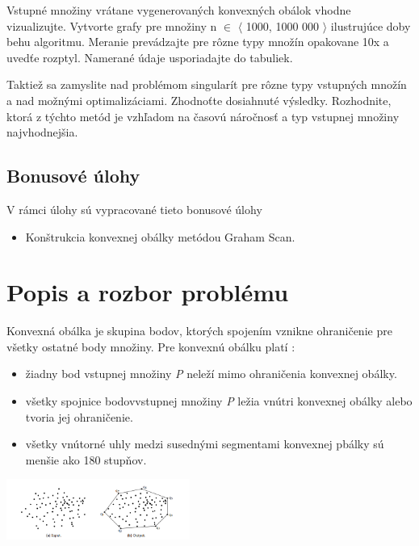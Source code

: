 \documentclass[12pt]{article}
\begin{document}
Vstupné množiny vrátane vygenerovaných konvexných obálok vhodne vizualizujte. Vytvorte grafy pre množiny n $\in$ $\langle$ 1000, 1000 000 $\rangle$ ilustrujúce doby behu algoritmu. Meranie prevádzajte pre rôzne typy množín opakovane 10x a uvedťe rozptyl. Namerané údaje usporiadajte do tabuliek.

Taktiež sa zamyslite nad problémom singularít pre rôzne typy vstupných množín a nad možnými optimalizáciami. Zhodnoťte dosiahnuté výsledky. Rozhodnite, ktorá z týchto metód je vzhľadom na časovú náročnosť a typ vstupnej množiny najvhodnejšia.

\subsection{Bonusové úlohy}
V rámci úlohy sú vypracované tieto bonusové úlohy

\begin{itemize}
\item Konštrukcia konvexnej obálky metódou Graham Scan.
\end{itemize}

\section{Popis a rozbor problému}
Konvexná obálka je skupina bodov, ktorých spojením vznikne ohraničenie pre všetky ostatné body množiny. Pre konvexnú obálku platí : 

\begin{itemize}
\item žiadny bod vstupnej množiny \textit{P} neleží mimo ohraničenia konvexnej obálky.
\item všetky spojnice bodovvstupnej množiny \textit{P} ležia vnútri konvexnej obálky alebo tvoria jej ohraničenie.
\item všetky vnútorné uhly medzi susednými segmentami konvexnej pbálky sú menšie ako 180 stupňov.
\end{itemize}

\begin{center}
   \includegraphics[width=6cm]{./img/ch_obrazok1.png}
\end{center}
\end{document}
